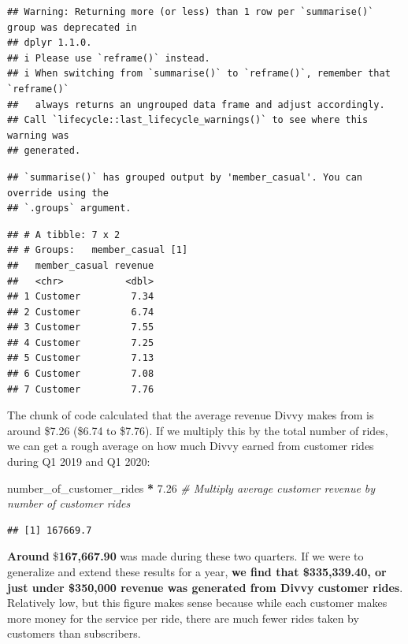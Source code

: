 \documentclass[
]{article}
\newenvironment{Shaded}{\begin{snugshade}}{\end{snugshade}}
\newcommand{\CommentTok}[1]{\textcolor[rgb]{0.56,0.35,0.01}{\textit{#1}}}
\newcommand{\FloatTok}[1]{\textcolor[rgb]{0.00,0.00,0.81}{#1}}
\newcommand{\NormalTok}[1]{#1}
\newcommand{\SpecialCharTok}[1]{\textcolor[rgb]{0.81,0.36,0.00}{\textbf{#1}}}
\begin{document}
\begin{verbatim}
## Warning: Returning more (or less) than 1 row per `summarise()` group was deprecated in
## dplyr 1.1.0.
## i Please use `reframe()` instead.
## i When switching from `summarise()` to `reframe()`, remember that `reframe()`
##   always returns an ungrouped data frame and adjust accordingly.
## Call `lifecycle::last_lifecycle_warnings()` to see where this warning was
## generated.
\end{verbatim}

\begin{verbatim}
## `summarise()` has grouped output by 'member_casual'. You can override using the
## `.groups` argument.
\end{verbatim}

\begin{verbatim}
## # A tibble: 7 x 2
## # Groups:   member_casual [1]
##   member_casual revenue
##   <chr>           <dbl>
## 1 Customer         7.34
## 2 Customer         6.74
## 3 Customer         7.55
## 4 Customer         7.25
## 5 Customer         7.13
## 6 Customer         7.08
## 7 Customer         7.76
\end{verbatim}

The chunk of code calculated that the average revenue Divvy makes from
is around \$7.26 (\$6.74 to \$7.76). If we multiply this by the total
number of rides, we can get a rough average on how much Divvy earned
from customer rides during Q1 2019 and Q1 2020:

\begin{Shaded}
\begin{Highlighting}[]
\NormalTok{number\_of\_customer\_rides }\SpecialCharTok{*} \FloatTok{7.26}  \CommentTok{\# Multiply average customer revenue by number of customer rides}
\end{Highlighting}
\end{Shaded}

\begin{verbatim}
## [1] 167669.7
\end{verbatim}

\textbf{Around} \$\textbf{167,667.90} was made during these two
quarters. If we were to generalize and extend these results for a year,
\textbf{we find that \$335,339.40, or just under \$350,000 revenue was
generated from Divvy customer rides}. Relatively low, but this figure
makes sense because while each customer makes more money for the service
per ride, there are much fewer rides taken by customers than
subscribers.
\end{document}
